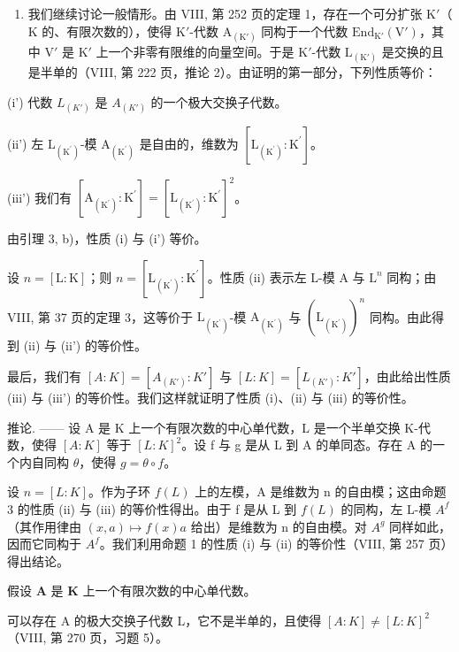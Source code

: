 \begin{enumerate}
\def\labelenumi{\Alph{enumi})}
\setcounter{enumi}{1}
\tightlist
\item
  我们继续讨论一般情形。由 VIII, 第 252 页的定理 1，存在一个可分扩张 \(\mathrm{K}'\)（\(\mathrm{K}\) 的、有限次数的），使得 \(\mathrm{K}'\)-代数 \(\mathrm{A}_{(\mathrm{K}')}\) 同构于一个代数 \(\mathrm{End}_{\mathrm{K}'}(\mathrm{V}')\)，其中 \(\mathrm{V}'\) 是 \(\mathrm{K}'\) 上一个非零有限维的向量空间。于是 \(\mathrm{K}'\)-代数 \(\mathrm{L}_{(\mathrm{K}')}\) 是交换的且是半单的（VIII, 第 222 页，推论 2）。由证明的第一部分，下列性质等价：
\end{enumerate}

(i') 代数 \(L_{(K')}\) 是 \(A_{(K')}\) 的一个极大交换子代数。

(ii') 左 \(\mathrm{L}_{(\mathrm{K}^{\prime})}\)-模 \(\mathrm{A}_{(\mathrm{K}^{\prime})}\) 是自由的，维数为 \([\mathrm{L}_{(\mathrm{K}^{\prime})}:\mathrm{K}^{\prime}]\)。

(iii') 我们有 \(\left[\mathrm{A}_{\left(\mathrm{K}^{\prime}\right)}:\mathrm{K}^{\prime}\right] = \left[\mathrm{L}_{\left(\mathrm{K}^{\prime}\right)}:\mathrm{K}^{\prime}\right]^{2}\)。

由引理 3, b)，性质 (i) 与 (i') 等价。

设 \(n = [\mathrm{L}:\mathrm{K}]\)；则 \(n = [\mathrm{L}_{(\mathrm{K}^{\prime})}:\mathrm{K}^{\prime}]\)。性质 (ii) 表示左 L-模 A 与 \(\mathrm{L}^n\) 同构；由 VIII, 第 37 页的定理 3，这等价于 \(\mathrm{L}_{(\mathrm{K}^{\prime})}\)-模 \(\mathrm{A}_{(\mathrm{K}^{\prime})}\) 与 \((\mathrm{L}_{(\mathrm{K}^{\prime})})^n\) 同构。由此得到 (ii) 与 (ii') 的等价性。

最后，我们有 \([A:K]=[A_{(K')}:K']\) 与 \([L:K]=[L_{(K')}:K']\)，由此给出性质 (iii) 与 (iii') 的等价性。我们这样就证明了性质 (i)、(ii) 与 (iii) 的等价性。

推论. —— 设 A 是 K 上一个有限次数的中心单代数，L 是一个半单交换 K-代数，使得 \([A:K]\) 等于 \([L:K]^{2}\)。设 f 与 g 是从 L 到 A 的单同态。存在 A 的一个内自同构 \(\theta\)，使得 \(g = \theta \circ f\)。

设 \(n = [L : K]\)。作为子环 \(f(L)\) 上的左模，A 是维数为 n 的自由模；这由命题 3 的性质 (ii) 与 (iii) 的等价性得出。由于 f 是从 L 到 \(f(L)\) 的同构，左 L-模 \(A^{f}\)（其作用律由 \((x, a) \mapsto f(x)a\) 给出）是维数为 n 的自由模。对 \(A^{g}\) 同样如此，因而它同构于 \(A^{f}\)。我们利用命题 1 的性质 (i) 与 (ii) 的等价性（VIII, 第 257 页）得出结论。

假设 \(\mathbf{A}\) 是 \(\mathbf{K}\) 上一个有限次数的中心单代数。

可以存在 A 的极大交换子代数 L，它不是半单的，且使得 \([A:K]\neq[L:K]^{2}\)（VIII, 第 270 页，习题 5）。

